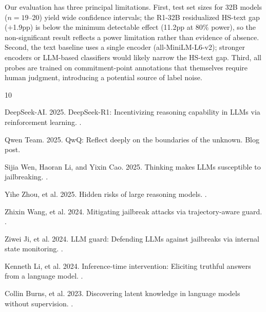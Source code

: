 \documentclass[11pt]{article}
\begin{document}
Our evaluation has three principal limitations. First, test set sizes for 32B models ($n{=}19$--20) yield wide confidence intervals; the R1-32B residualized HS-text gap ($+$1.9pp) is below the minimum detectable effect (11.2pp at 80\% power), so the non-significant result reflects a power limitation rather than evidence of absence. Second, the text baseline uses a single encoder (all-MiniLM-L6-v2); stronger encoders or LLM-based classifiers would likely narrow the HS-text gap. Third, all probes are trained on commitment-point annotations that themselves require human judgment, introducing a potential source of label noise.



\begin{thebibliography}{10}

DeepSeek-AI. 2025.
\newblock DeepSeek-R1: Incentivizing reasoning capability in LLMs via reinforcement learning.
.

Qwen Team. 2025.
\newblock QwQ: Reflect deeply on the boundaries of the unknown.
\newblock Blog post.

Sijia Wen, Haoran Li, and Yixin Cao. 2025.
\newblock Thinking makes LLMs susceptible to jailbreaking.
.

Yihe Zhou, et al. 2025.
\newblock Hidden risks of large reasoning models.
.

Zhixin Wang, et al. 2024.
\newblock Mitigating jailbreak attacks via trajectory-aware guard.
.

Ziwei Ji, et al. 2024.
\newblock LLM guard: Defending LLMs against jailbreaks via internal state monitoring.
.

Kenneth Li, et al. 2024.
\newblock Inference-time intervention: Eliciting truthful answers from a language model.
.

Collin Burns, et al. 2023.
\newblock Discovering latent knowledge in language models without supervision.
.


\end{thebibliography}
\end{document}
